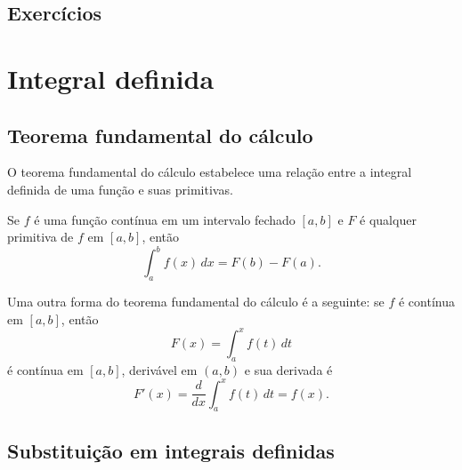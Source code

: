 \emconstrucao

\subsection*{Exercícios}

\emconstrucao

\section{Integral definida}\label{cap_int_intdef}

\emconstrucao

\subsection{Teorema fundamental do cálculo}

O teorema fundamental do cálculo estabelece uma relação entre a integral definida de uma função e suas primitivas.

\begin{teo}
  Se $f$ é uma função contínua em um intervalo fechado $[a, b]$ e $F$ é qualquer primitiva de $f$ em $[a, b]$, então
  \begin{equation}
    \int_a^b f(x)\,dx = F(b)-F(a).
  \end{equation}
\end{teo}

\begin{obs}\label{obs:tfc1}
  Uma outra forma do teorema fundamental do cálculo é a seguinte: se $f$ é contínua em $[a, b]$, então
  \begin{equation}
    F(x) = \int_a^x f(t)\,dt
  \end{equation}
  é contínua em $[a, b]$, derivável em $(a, b)$ e sua derivada é
  \begin{equation}
    F'(x) = \frac{d}{dx}\int_a^x f(t)\,dt = f(x).
  \end{equation}
\end{obs}

\subsection{Substituição em integrais definidas}

